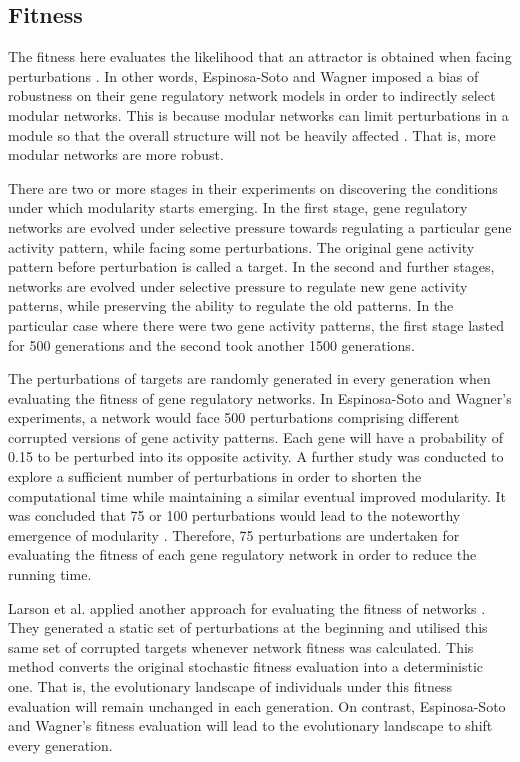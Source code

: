 \subsection{Fitness}
The fitness here evaluates the likelihood that an attractor is obtained when facing perturbations \cite{espinosa2010specialization}. In other words, Espinosa-Soto and Wagner imposed a bias of robustness on their gene regulatory network models in order to indirectly select modular networks. This is because modular networks can limit perturbations in a module so that the overall structure will not be heavily affected \cite{aderems2005systems}. That is, more modular networks are more robust. 

There are two or more stages in their experiments on discovering the conditions under which modularity starts emerging. In the first stage, gene regulatory networks are evolved under selective pressure towards regulating a particular gene activity pattern, while facing some perturbations. The original gene activity pattern before perturbation is called a target. In the second and further stages, networks are evolved under selective pressure to regulate new gene activity patterns, while preserving the ability to regulate the old patterns. In the particular case where there were two gene activity patterns, the first stage lasted for 500 generations and the second took another 1500 generations. 

The perturbations of targets are randomly generated in every generation when evaluating the fitness of gene regulatory networks. In Espinosa-Soto and Wagner's experiments, a network would face 500 perturbations comprising different corrupted versions of gene activity patterns. Each gene will have a probability of 0.15 to be perturbed into its opposite activity. A further study was conducted to explore a sufficient number of perturbations in order to shorten the computational time while maintaining a similar eventual improved modularity. It was concluded that 75 or 100 perturbations would lead to the noteworthy emergence of modularity \cite{totten2015exploring}. Therefore, 75 perturbations are undertaken for evaluating the fitness of each gene regulatory network in order to reduce the running time. 

Larson et al. applied another approach for evaluating the fitness of networks \cite{larson2016recombination}. They generated a static set of perturbations at the beginning and utilised this same set of corrupted targets whenever network fitness was calculated. This method converts the original stochastic fitness evaluation into a deterministic one. That is, the evolutionary landscape of individuals under this fitness evaluation will remain unchanged in each generation. On contrast, Espinosa-Soto and Wagner's fitness evaluation will lead to the evolutionary landscape to shift every generation. 

